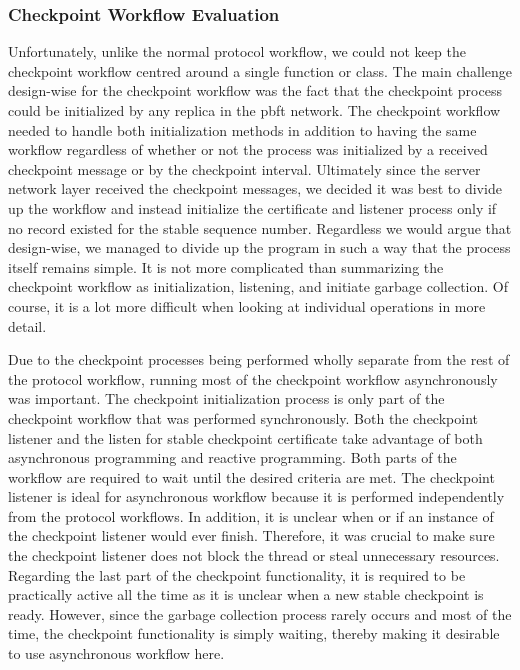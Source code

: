 \subsubsection{Checkpoint Workflow Evaluation}
\label{sec:checkpointEval}
Unfortunately, unlike the normal protocol workflow, we could not keep the checkpoint workflow centred around a single function or class. 
The main challenge design-wise for the checkpoint workflow was the fact that the checkpoint process could be initialized by any replica in the \ac{pbft} network. The checkpoint workflow needed to handle both initialization methods in addition to having the same workflow regardless of whether or not the process was initialized by a received checkpoint message or by the checkpoint interval. Ultimately since the server network layer received the checkpoint messages, we decided it was best to divide up the workflow and instead initialize the certificate and listener process only if no record existed for the stable sequence number. Regardless we would argue that design-wise, we managed to divide up the program in such a way that the process itself remains simple. It is not more complicated than summarizing the checkpoint workflow as initialization, listening, and initiate garbage collection. Of course, it is a lot more difficult when looking at individual operations in more detail. 

Due to the checkpoint processes being performed wholly separate from the rest of the protocol workflow, running most of the checkpoint workflow asynchronously was important. The checkpoint initialization process is only part of the checkpoint workflow that was performed synchronously. Both the checkpoint listener and the listen for stable checkpoint certificate take advantage of both asynchronous programming and reactive programming. Both parts of the workflow are required to wait until the desired criteria are met. The checkpoint listener is ideal for asynchronous workflow because it is performed independently from the protocol workflows. In addition, it is unclear when or if an instance of the checkpoint listener would ever finish. Therefore, it was crucial to make sure the checkpoint listener does not block the thread or steal unnecessary resources.
Regarding the last part of the checkpoint functionality, it is required to be practically active all the time as it is unclear when a new stable checkpoint is ready. However, since the garbage collection process rarely occurs and most of the time, the checkpoint functionality is simply waiting, thereby making it desirable to use asynchronous workflow here.

